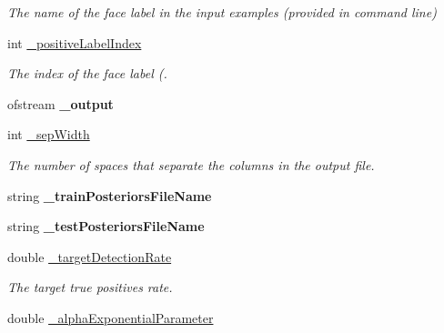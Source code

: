\begin{DoxyCompactItemize}
\begin{DoxyCompactList}\small\item\em The name of the face label in the input examples (provided in command line) \end{DoxyCompactList}\item 
int \hyperlink{classMultiBoost_1_1SoftCascadeLearner_a2320fe07381d7bf0ea101ff50735ec6e}{\-\_\-positive\-Label\-Index}
\begin{DoxyCompactList}\small\item\em The index of the face label (. \end{DoxyCompactList}\item 
\hypertarget{classMultiBoost_1_1SoftCascadeLearner_a9d7d4fff4db6c536d1d2672c14f85402}{ofstream {\bfseries \-\_\-output}}\label{classMultiBoost_1_1SoftCascadeLearner_a9d7d4fff4db6c536d1d2672c14f85402}

\item 
\hypertarget{classMultiBoost_1_1SoftCascadeLearner_a6a264da7f800b97972b4c2ac0b23961f}{int \hyperlink{classMultiBoost_1_1SoftCascadeLearner_a6a264da7f800b97972b4c2ac0b23961f}{\-\_\-sep\-Width}}\label{classMultiBoost_1_1SoftCascadeLearner_a6a264da7f800b97972b4c2ac0b23961f}

\begin{DoxyCompactList}\small\item\em The number of spaces that separate the columns in the output file. \end{DoxyCompactList}\item 
\hypertarget{classMultiBoost_1_1SoftCascadeLearner_a2aa9de3843fc553b2dec67af66373687}{string {\bfseries \-\_\-train\-Posteriors\-File\-Name}}\label{classMultiBoost_1_1SoftCascadeLearner_a2aa9de3843fc553b2dec67af66373687}

\item 
\hypertarget{classMultiBoost_1_1SoftCascadeLearner_aac7c63554e3e497e24ba404921835354}{string {\bfseries \-\_\-test\-Posteriors\-File\-Name}}\label{classMultiBoost_1_1SoftCascadeLearner_aac7c63554e3e497e24ba404921835354}

\item 
\hypertarget{classMultiBoost_1_1SoftCascadeLearner_a3ce4c7871038d08fe0c6c7e83420ddbb}{double \hyperlink{classMultiBoost_1_1SoftCascadeLearner_a3ce4c7871038d08fe0c6c7e83420ddbb}{\-\_\-target\-Detection\-Rate}}\label{classMultiBoost_1_1SoftCascadeLearner_a3ce4c7871038d08fe0c6c7e83420ddbb}

\begin{DoxyCompactList}\small\item\em The target true positives rate. \end{DoxyCompactList}\item 
\hypertarget{classMultiBoost_1_1SoftCascadeLearner_a630f12fd139bb9c85e729395f984f2ec}{double \hyperlink{classMultiBoost_1_1SoftCascadeLearner_a630f12fd139bb9c85e729395f984f2ec}{\-\_\-alpha\-Exponential\-Parameter}}\label{classMultiBoost_1_1SoftCascadeLearner_a630f12fd139bb9c85e729395f984f2ec}


\end{DoxyCompactItemize}
